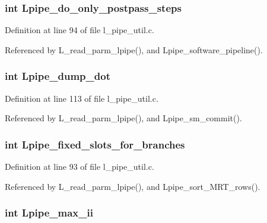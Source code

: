 \subsubsection{\setlength{\rightskip}{0pt plus 5cm}int \bf{Lpipe\_\-do\_\-only\_\-postpass\_\-steps}}\label{l__pipe__util_8h_414f010c3e4a932c6061bb593e7945b0}




Definition at line 94 of file l\_\-pipe\_\-util.c.

Referenced by L\_\-read\_\-parm\_\-lpipe(), and Lpipe\_\-software\_\-pipeline().
\subsubsection{\setlength{\rightskip}{0pt plus 5cm}int \bf{Lpipe\_\-dump\_\-dot}}\label{l__pipe__util_8h_2b86b75abb1973402ba2363621a03bb3}




Definition at line 113 of file l\_\-pipe\_\-util.c.

Referenced by L\_\-read\_\-parm\_\-lpipe(), and Lpipe\_\-sm\_\-commit().
\subsubsection{\setlength{\rightskip}{0pt plus 5cm}int \bf{Lpipe\_\-fixed\_\-slots\_\-for\_\-branches}}\label{l__pipe__util_8h_5dfc4a9a1248286c8e15ad45456ddb90}




Definition at line 93 of file l\_\-pipe\_\-util.c.

Referenced by L\_\-read\_\-parm\_\-lpipe(), and Lpipe\_\-sort\_\-MRT\_\-rows().
\subsubsection{\setlength{\rightskip}{0pt plus 5cm}int \bf{Lpipe\_\-max\_\-ii}}\label{l__pipe__util_8h_971e2f43a9bcf87d02ca3adb1f632358}




